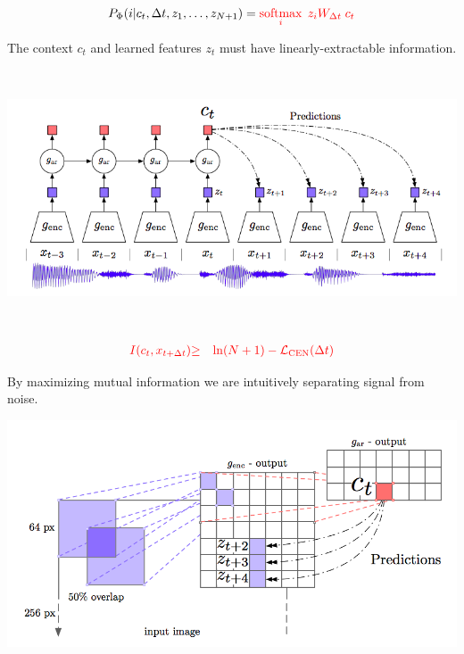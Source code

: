 {$$P_\Phi(i|c_t,\Delta t,z_1,\ldots,z_{N+1}) = {\color{red} \operatorname*{softmax}_i\;z_iW_{\Delta t}\;c_t}$$

\vfill
The context $c_t$ and learned features $z_t$ must have {\color{red} linearly-extractable} information.


\centerline{\includegraphics[height = 3.0in]{../images/MMI-PC}}

\begin{eqnarray*}
{\color{red} I(c_t,x_{t+\Delta t})} & {\color{red} \geq} & {\color{red} \ln (N +1) - {\cal L}_\mathrm{CEN}(\Delta t)}
\end{eqnarray*}

\vfill
By maximizing mutual information we are intuitively separating signal from noise.


\centerline{\includegraphics[width=8.0 in]{../images/LearnRepCTCb}}


}
